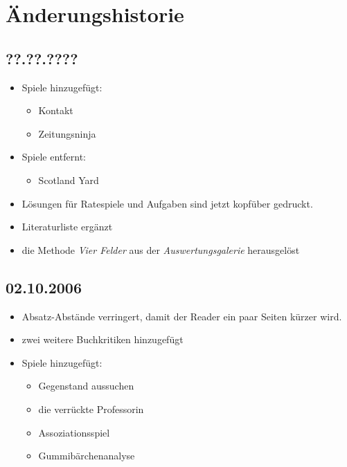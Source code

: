 \chapter{Änderungshistorie}
\section*{??.??.????}
\begin{itemize}
  \item Spiele hinzugefügt:
    \begin{itemize}
      \item Kontakt
      \item Zeitungsninja
    \end{itemize}
  \item Spiele entfernt:
    \begin{itemize}
      \item Scotland Yard
    \end{itemize}
  \item Lösungen für Ratespiele und Aufgaben sind jetzt kopfüber gedruckt.
  \item Literaturliste ergänzt
  \item die Methode \emph{Vier Felder} aus der \emph{Auswertungsgalerie} herausgelöst
\end{itemize}


\section*{02.10.2006}
\begin{itemize}
  \item Absatz-Abstände verringert, damit der Reader ein paar Seiten kürzer wird.
  \item zwei weitere Buchkritiken hinzugefügt
  \item Spiele hinzugefügt:
  \begin{itemize}
    \item Gegenstand aussuchen
    \item die verrückte Professorin
    \item Assoziationsspiel
    \item Gummibärchenanalyse
  \end{itemize}
\end{itemize}




